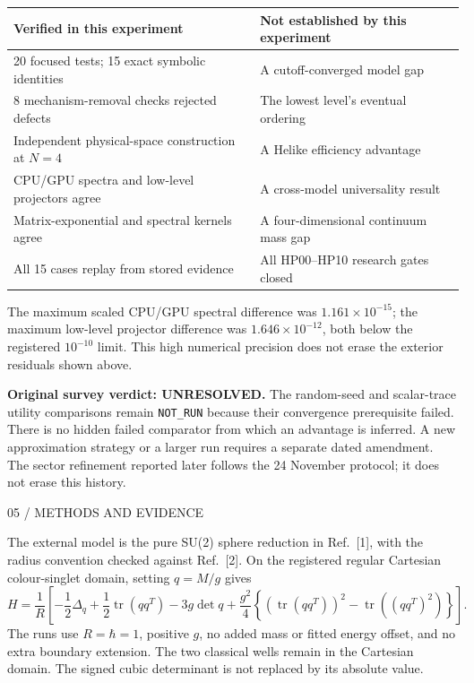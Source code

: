 \documentclass[11pt,letterpaper]{article}
\theoremstyle{plain}
\theoremstyle{definition}
\newcommand{\eyebrow}[1]{{\sffamily\small\color{teal}#1}\par}
\newcommand{\pagetitle}[2]{\eyebrow{#1}\vspace{3pt}{\LARGE #2}\par\vspace{5pt}}
\begin{document}
\begin{center}\small
\begin{tabular}{@{}p{3.1in}p{3.05in}@{}}\toprule
\textbf{Verified in this experiment} & \textbf{Not established by this experiment}\\\midrule
20 focused tests; 15 exact symbolic identities & A cutoff-converged model gap\\
8 mechanism-removal checks rejected defects & The lowest level's eventual ordering\\
Independent physical-space construction at $N=4$ & A Helike efficiency advantage\\
CPU/GPU spectra and low-level projectors agree & A cross-model universality result\\
Matrix-exponential and spectral kernels agree & A four-dimensional continuum mass gap\\
All 15 cases replay from stored evidence & All HP00--HP10 research gates closed\\\bottomrule
\end{tabular}
\end{center}

The maximum scaled CPU/GPU spectral difference was $1.161\times10^{-15}$;
the maximum low-level projector difference was $1.646\times10^{-12}$, both below
the registered $10^{-10}$ limit. This high numerical precision does not erase
the exterior residuals shown above.

\textbf{Original survey verdict: UNRESOLVED.}
The random-seed and scalar-trace utility comparisons remain \texttt{NOT\_RUN}
because their convergence prerequisite failed. There is no hidden failed
comparator from which an advantage is inferred. A new approximation strategy
or a larger run requires a separate dated amendment. The sector refinement
reported later follows the 24 November protocol; it does not erase this history.

\newpage
\pagetitle{05 / METHODS AND EVIDENCE}{A published Hamiltonian and a replayable calculation}
The external model is the pure SU(2) sphere reduction in Ref.~[1], with the
radius convention checked against Ref.~[2]. On the registered regular Cartesian
colour-singlet domain, setting $q=M/g$ gives
\[
 H=\frac1R\left[-\frac12\Delta_q+\frac12\operatorname{tr}(qq^T)
 -3g\det q+\frac{g^2}{4}
 \left\{(\operatorname{tr}(qq^T))^2-\operatorname{tr}((qq^T)^2)\right\}\right].
\]
The runs use $R=\hbar=1$, positive $g$, no added mass or fitted energy offset,
and no extra boundary extension. The two classical wells remain in the
Cartesian domain. The signed cubic determinant is not replaced by its absolute value.
\end{document}
